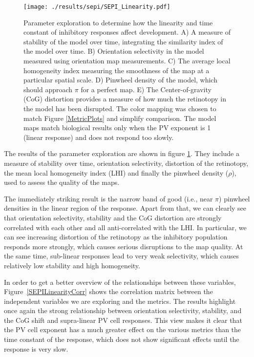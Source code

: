 \begin{figure}
	\centering
        \texttt{[image: ./results/sepi/SEPI\_Linearity.pdf]}
	\caption[Analysis of development in SEPI model when varying time
      constant and linearity of responses]{Parameter exploration to
      determine how the linearity and time constant of inhibitory
      responses affect development. A) A measure of stability of the
      model over time, integrating the similarity index of the model
      over time. B) Orientation selectivity in the model measured
      using orientation map measurements. C) The average local
      homogeneity index measuring the smoothness of the map at a
      particular spatial scale. D) Pinwheel density of the model,
      which should approach $\pi$ for a perfect map. E) The
      Center-of-gravity (CoG) distortion provides a measure of how
      much the retinotopy in the model has been disrupted. The color
      mapping was chosen to match Figure \ref{MetricPlots} and
      simplify comparison. The model maps match biological results
      only when the PV exponent is 1 (linear response) and does not
      respond too slowly.}
	\label{SEPILinearity}
\end{figure}

The results of the parameter exploration are shown in figure
\ref{SEPILinearity}. They include a measure of stability over time,
orientation selectivity, distortion of the retinotopy, the mean local
homogeneity index (LHI) and finally the pinwheel density ($\rho$),
used to assess the quality of the maps.

The immediately striking result is the narrow band of good (i.e., near
$\pi$) pinwheel densities in the linear region of the response. Apart
from that, we can clearly see that orientation selectivity, stability
and the CoG distortion are strongly correlated with each other and all
anti-correlated with the LHI. In particular, we can see increasing
distortion of the retinotopy as the inhibitory population responds
more strongly, which causes serious disruptions to the map quality. At
the same time, sub-linear responses lead to very weak selectivity,
which causes relatively low stability and high homogeneity.

In order to get a better overview of the relationships between these
variables, Figure~\ref{SEPILinearityCorr} shows the correlation matrix
between the independent variables we are exploring and the
metrics. The results highlight once again the strong relationship
between orientation selectivity, stability, and the CoG shift and
supra-linear PV cell responses. This view makes it clear that the PV
cell exponent has a much greater effect on the various metrics than
the time constant of the response, which does not show significant
effects until the response is very slow.

